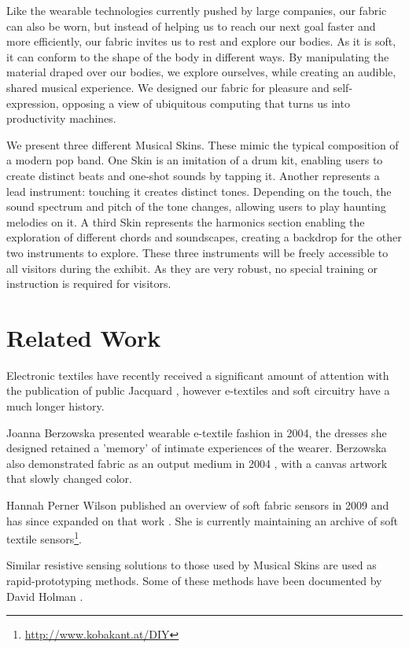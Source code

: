 \documentclass{sigchi-ext}
\begin{document}
Like the wearable technologies currently pushed by large companies, our fabric can also be worn, but instead of helping us to reach our next goal faster and more efficiently, our fabric invites us to rest and explore our bodies. As it is soft, it can conform to the shape of the body in different ways. By manipulating the material draped over our bodies, we explore ourselves, while creating an audible, shared musical experience. We designed our fabric for pleasure and self-expression, opposing a view of ubiquitous computing that turns us into productivity machines.

We present three different Musical Skins. These mimic the typical composition of a modern pop band. One Skin is an imitation of a drum kit, enabling users to create distinct beats and one-shot sounds by tapping it. Another represents a lead instrument: touching it creates distinct tones. Depending on the touch, the sound spectrum and pitch of the tone changes, allowing users to play haunting melodies on it. A third Skin represents the harmonics section enabling the exploration of different chords and soundscapes, creating a backdrop for the other two instruments to explore. These three instruments will be freely accessible to all visitors during the exhibit. As they are very robust, no special training or instruction is required for visitors.


\section{Related Work}
Electronic textiles have recently received a significant amount of attention with the publication of public Jacquard \cite{jacquard}, however e-textiles and soft circuitry have a much longer history.

Joanna Berzowska presented wearable e-textile fashion in 2004\cite{berzowska:04}, the dresses she designed retained a 'memory' of intimate experiences of the wearer. Berzowska also demonstrated fabric as an output medium in 2004 \cite{berzowska:05} , with a canvas artwork that slowly changed color.

Hannah Perner Wilson published an overview of soft fabric sensors in 2009 \cite{perner-wilson:09} and has since expanded on that work \cite{perner-wilson:10}. She is currently maintaining an archive of soft textile sensors\footnote{\url{http://www.kobakant.at/DIY}}.

Similar resistive sensing solutions to those used by Musical Skins are used as rapid-prototyping methods. Some of these methods have been documented by David Holman \cite{holman:14, holman:11}.
\end{document}
